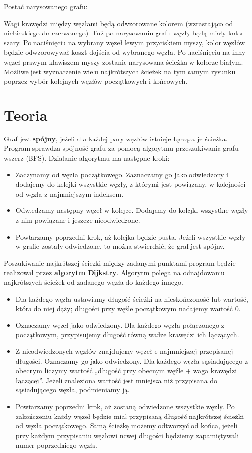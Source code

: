 \documentclass[]{article}
\begin{document}
Postać narysowanego grafu:

Wagi krawędzi między węzłami będą odwzorowane kolorem (wzrastająco od niebieskiego do czerwonego). Tuż po narysowaniu grafu węzły będą miały kolor szary. Po naciśnięciu na wybrany węzeł lewym przyciskiem myszy, kolor węzłów będzie odwzorowywał koszt dojścia od wybranego węzła. Po naciśnięciu na inny węzeł prawym klawiszem myszy zostanie narysowana ścieżka w kolorze białym. Możliwe jest wyznaczenie wielu najkrótszych ścieżek na tym samym rysunku poprzez wybór kolejnych węzłów początkowych i końcowych.


\section{Teoria}\label{header-n279}

Graf jest \textbf{spójny}, jeżeli dla każdej pary węzłów istnieje łącząca je ścieżka. Program sprawdza spójność grafu za pomocą algorytmu przeszukiwania grafu wszerz (BFS). Działanie algorytmu ma następne kroki:
\begin{itemize}
\item
  Zaczynamy od węzła początkowego. Zaznaczamy go jako odwiedzony i dodajemy do kolejki wszystkie węzły, z którymi jest powiązany, w kolejności od węzła z najmniejszym indeksem.
\item
  Odwiedzamy następny węzeł w kolejce. Dodajemy do kolejki wszystkie węzły z nim powiązane i jeszcze nieodwiedzone.
\item
  Powtarzamy poprzedni krok, aż kolejka będzie pusta. Jeżeli wszystkie węzły w grafie zostały odwiedzone, to można stwierdzić, że graf jest spójny.
\end{itemize}

Poszukiwanie najkrótszej ścieżki między zadanymi punktami program będzie realizował przez \textbf{algorytm Dijkstry}. Algorytm polega na odnajdowaniu najkrótszych ścieżek od zadanego węzła do każdego innego. 
\begin{itemize}
\item
  Dla każdego węzła ustawiamy długość ścieżki na nieskończoność lub wartość, która do niej dąży; długości przy węźle początkowym nadajemy wartość 0. 
\item
  Oznaczamy węzeł jako odwiedzony. Dla każdego węzła połączonego z początkowym, przypisujemy długość równą wadze krawędzi ich łączących.
  \newpage
\item
  Z nieodwiedzonych węzłów znajdujemy węzeł o najmniejszej przepisanej długości. Oznaczamy go jako odwiedzony. Dla każdego węzła sąsiadującego z obecnym liczymy wartość „długość przy obecnym węźle + waga krawędzi łączącej”. Jeżeli znaleziona wartość jest mniejsza niż przypisana do sąsiadującego węzła, podmieniamy ją.
\item
  Powtarzamy poprzedni krok, aż zostaną odwiedzone wszystkie węzły. Po zakończeniu każdy węzeł będzie miał przypisaną długość najkrótszej ścieżki od węzła początkowego. Samą ścieżkę możemy odtworzyć od końca, jeżeli przy każdym przypisaniu węzłowi nowej długości będziemy zapamiętywali numer poprzedniego węzła.
\end{itemize}
\end{document}
